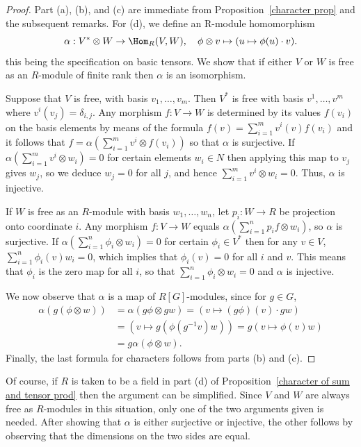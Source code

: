 \begin{proof}
Part (a), (b), and (c) are immediate from Proposition~\ref{character prop} and the subsequent remarks. For (d), we define an R-module homomorphism
\[\alpha:V^*\otimes W\to\Hom_R(V,W),\quad \phi\otimes v\mapsto(u\mapsto\phi(u)\cdot v).\]
this being the specification on basic tensors. We show that if either $V$ or $W$ is free as an $R$-module of finite rank then $\alpha$ is an isomorphism.\par
Suppose that $V$ is free, with basis $v_1,\dots,v_m$. Then $V^*$ is free with basis $v^1,\dots,v^m$ where $v^i(v_j)=\delta_{i,j}$. Any morphism $f:V\to W$ is determined by its values $f(v_i)$ on the basis elements by means of the formula $f(v)=\sum_{i=1}^{m}v^i(v)f(v_i)$ and it follows that $f=\alpha(\sum_{i=1}^{m}v^i\otimes f(v_i))$ so that $\alpha$ is surjective. If $\alpha(\sum_{i=1}^{m}v^i\otimes w_i)=0$ for certain elements $w_i\in N$ then applying this map to $v_j$ gives $w_j$, so we deduce $w_j=0$ for all $j$, and hence $\sum_{i=1}^{m}v^i\otimes w_i=0$. Thus, $\alpha$ is injective.\par
If $W$ is free as an $R$-module with basis $w_1,\dots,w_n$, let $p_i:W\to R$ be projection onto coordinate $i$. Any morphism $f:V\to W$ equals $\alpha(\sum_{i=1}^{n}p_if\otimes w_i)$, so $\alpha$ is surjective. If $\alpha(\sum_{i=1}^{n}\phi_i\otimes w_i)=0$ for certain $\phi_i\in V^*$ then for any $v\in V$, $\sum_{i=1}^{n}\phi_i(v)w_i=0$, which implies that $\phi_i(v)=0$ for all $i$ and $v$. This means that $\phi_i$ is the zero map for all $i$, so that $\sum_{i=1}^{n}\phi_i\otimes w_i=0$ and $\alpha$ is injective.\par
We now observe that $\alpha$ is a map of $R[G]$-modules, since for $g\in G$,
\begin{align*}
\alpha(g(\phi\otimes w))&=\alpha(g\phi\otimes gw)=(v\mapsto(g\phi)(v)\cdot gw)\\
&=(v\mapsto g(\phi(g^{-1}v)w))=g(v\mapsto\phi(v)w)\\
&=g\alpha(\phi\otimes w).
\end{align*}
Finally, the last formula for characters follows from parts (b) and (c).
\end{proof}
Of course, if $R$ is taken to be a field in part (d) of Proposition~\ref{character of sum and tensor prod} then the argument can be simplified. Since $V$ and $W$ are always free as $R$-modules in this situation, only one of the two arguments given is needed. After showing that $\alpha$ is either surjective or injective, the other follows by observing that the dimensions on the two sides are equal.
